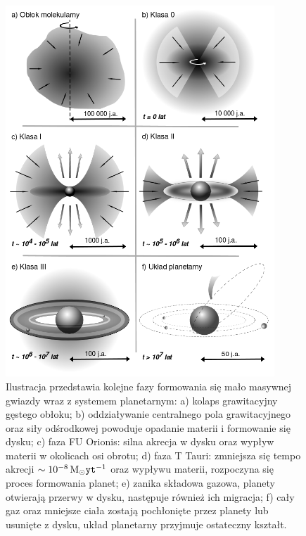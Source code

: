 \begin{figure}[p]
\centering 
\includegraphics[width=0.9\textwidth]{figures/planetformation.png}
\caption{Ilustracja przedstawia kolejne fazy formowania się mało masywnej gwiazdy
   wraz z systemem planetarnym: a) kolaps grawitacyjny gęstego obłoku; b)
   oddziaływanie centralnego pola grawitacyjnego oraz siły odśrodkowej powoduje
   opadanie materii i formowanie się dysku; c) faza FU Orionis: silna akrecja w
   dysku oraz wypływ materii w okolicach osi obrotu; d) faza T Tauri: zmniejsza
   się tempo akrecji $\sim 10^{-8}\hbox{$\mathrm{\thinspace M_{\odot}}$}{\texttt{yt}}^{-1}$ oraz wypływu materii,
   rozpoczyna się proces formowania planet; e) zanika składowa gazowa, planety
otwierają przerwy w dysku, następuje również ich migracja; f) cały gaz oraz
mniejsze ciała zostają pochłonięte przez planety lub usunięte z dysku, układ
planetarny przyjmuje ostateczny kształt.}

\label{fig:planet}
\end{figure}


